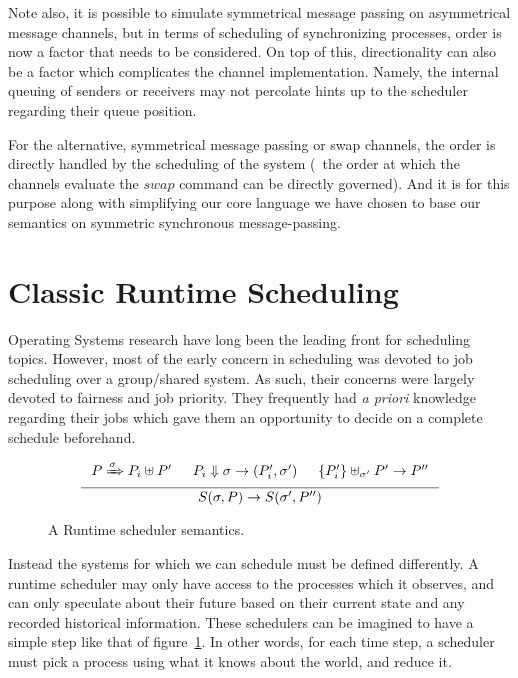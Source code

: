 Note also, it is possible to simulate symmetrical message passing on asymmetrical 
message channels, but in terms of scheduling of synchronizing processes, order 
is now a factor that needs to be considered. On top of this, directionality can 
also be a factor which complicates the channel implementation. Namely, the 
internal queuing of senders or receivers may not percolate hints up to the 
scheduler regarding their queue position. 

For the alternative, symmetrical message passing or swap channels, the order is 
directly handled by the scheduling of the system (\ie~the order at which the 
channels evaluate the $swap$ command can be directly governed). And it is for 
this purpose along with simplifying our core language we have chosen to base our
semantics on symmetric synchronous message-passing. 

\section{Classic Runtime Scheduling}

Operating Systems research have long been the leading front for scheduling topics. 
However, most of the early concern in scheduling was devoted to job scheduling 
over a group/shared system. As such, their concerns were largely devoted to 
fairness and job priority. They frequently had {\sl a priori} knowledge regarding
their jobs which gave them an opportunity to decide on a complete schedule 
beforehand.

\begin{figure}
    \[
        \inference{ P \xRightarrow{\sigma} P_i \uplus P' &
                    P_i \Downarrow \sigma \rightarrow (P_i',\sigma') &
                    \{ P_i' \}  \uplus_{\sigma'} P' \rightarrow P''
                  }
                  { S(\sigma, P ) \rightarrow S(\sigma', P'') }
    \]
    \caption{A Runtime scheduler semantics.}
    \label{fig:scheduler-step}
\end{figure}

Instead the systems for which we can schedule must be defined differently.
A runtime scheduler may only have access to the processes which it observes, 
and can only speculate about their future based on their current state and any
recorded historical information. These schedulers can be imagined to have a 
simple step like that of figure~\ref{fig:scheduler-step}. In other words, for
each time step, a scheduler must pick a process using what it knows about the 
world, and reduce it. 

